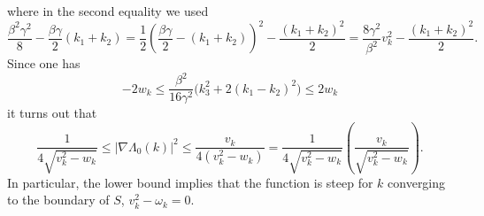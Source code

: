 \documentclass[a4paper,11pt]{article}
\numberwithin{equation}{section}
\begin{document}
where in the second equality we used 
\begin{equation}
    \frac{\beta^2\gamma^2}{8} - \frac{\beta\gamma}{2}(k_1 + k_2) = \frac{1}{2}\left( \frac{\beta\gamma}{2} - (k_1+k_2) \right)^2 - \frac{(k_1+k_2)^2}{2} = \frac{8 \gamma^2}{\beta^2}v_k^2 -  \frac{(k_1+k_2)^2}{2} .
\end{equation}
Since one has
\begin{equation}
 -2w_k  \leq \frac{\beta^2}{16\gamma^2}\Big(k_3^2 + 2(k_1-k_2)^2\Big) \leq 2w_k
\end{equation}
it turns out that
\begin{equation}
  \frac{1}{4 \sqrt{v_k^2 -w_k }}  \leq  \big|\nabla \Lambda_0(k)\big|^2 \leq \frac{v_k}{4 (v_k^2 -w_k )} = \frac{1}{4 \sqrt{v_k^2 -w_k }} \left( \frac{v_k}{\sqrt{v_k^2 -w_k}} \right) .
\end{equation}
In particular, the lower bound implies that the function is steep for $k$ converging to the boundary of $S$, $v_k^2-\omega_k=0$.
\end{document}
